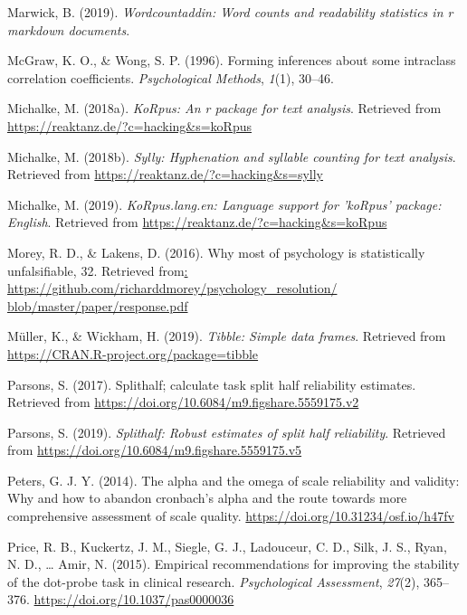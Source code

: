 \documentclass[english,,man,floatsintext]{apa6}
\begin{document}
\leavevmode\hypertarget{ref-R-wordcountaddin}{}%
Marwick, B. (2019). \emph{Wordcountaddin: Word counts and readability statistics in r markdown documents}.

\leavevmode\hypertarget{ref-mcgraw_forming_1996}{}%
McGraw, K. O., \& Wong, S. P. (1996). Forming inferences about some intraclass correlation coefficients. \emph{Psychological Methods}, \emph{1}(1), 30--46.

\leavevmode\hypertarget{ref-R-koRpus}{}%
Michalke, M. (2018a). \emph{KoRpus: An r package for text analysis}. Retrieved from \url{https://reaktanz.de/?c=hacking\&s=koRpus}

\leavevmode\hypertarget{ref-R-sylly}{}%
Michalke, M. (2018b). \emph{Sylly: Hyphenation and syllable counting for text analysis}. Retrieved from \url{https://reaktanz.de/?c=hacking\&s=sylly}

\leavevmode\hypertarget{ref-R-koRpus.lang.en}{}%
Michalke, M. (2019). \emph{KoRpus.lang.en: Language support for 'koRpus' package: English}. Retrieved from \url{https://reaktanz.de/?c=hacking\&s=koRpus}

\leavevmode\hypertarget{ref-morey_why_2016}{}%
Morey, R. D., \& Lakens, D. (2016). Why most of psychology is statistically unfalsiﬁable, 32. Retrieved from\href{:\%20https://github.com/richarddmorey/psychology_resolution/\%20blob/master/paper/response.pdf}{: https://github.com/richarddmorey/psychology\_resolution/ blob/master/paper/response.pdf}

\leavevmode\hypertarget{ref-R-tibble}{}%
Müller, K., \& Wickham, H. (2019). \emph{Tibble: Simple data frames}. Retrieved from \url{https://CRAN.R-project.org/package=tibble}

\leavevmode\hypertarget{ref-R-splithalf}{}%
Parsons, S. (2017). Splithalf; calculate task split half reliability estimates. Retrieved from \url{https://doi.org/10.6084/m9.figshare.5559175.v2}

\leavevmode\hypertarget{ref-parsons_splithalf:_2019}{}%
Parsons, S. (2019). \emph{Splithalf: Robust estimates of split half reliability}. Retrieved from \url{https://doi.org/10.6084/m9.figshare.5559175.v5}

\leavevmode\hypertarget{ref-peters_alpha_2014}{}%
Peters, G. J. Y. (2014). The alpha and the omega of scale reliability and validity: Why and how to abandon cronbach's alpha and the route towards more comprehensive assessment of scale quality. \url{https://doi.org/10.31234/osf.io/h47fv}

\leavevmode\hypertarget{ref-price_empirical_2015}{}%
Price, R. B., Kuckertz, J. M., Siegle, G. J., Ladouceur, C. D., Silk, J. S., Ryan, N. D., \ldots{} Amir, N. (2015). Empirical recommendations for improving the stability of the dot-probe task in clinical research. \emph{Psychological Assessment}, \emph{27}(2), 365--376. \url{https://doi.org/10.1037/pas0000036}
\end{document}
